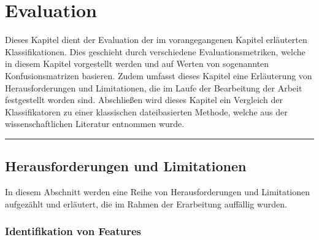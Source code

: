 
\chapter{Evaluation}
\label{evaluation}

Dieses Kapitel dient der Evaluation der im vorangegangenen Kapitel erläuterten Klassifikationen. Dies geschieht durch verschiedene Evaluationsmetriken, welche in diesem Kapitel vorgestellt werden und auf Werten von sogenannten Konfusionsmatrizen basieren. Zudem umfasst dieses Kapitel eine Erläuterung von Herausforderungen und Limitationen, die im Laufe der Bearbeitung der Arbeit festgestellt worden sind. Abschließen wird dieses Kapitel ein Vergleich der Klassifikatoren zu einer klassischen dateibasierten Methode, welche aus der wissenschaftlichen Literatur entnommen wurde.
\\
\hrule

\section{Herausforderungen und Limitationen}

In diesem Abschnitt werden eine Reihe von Herausforderungen und Limitationen aufgezählt und erläutert, die im Rahmen der Erarbeitung auffällig wurden.

\subsection*{Identifikation von Features}

